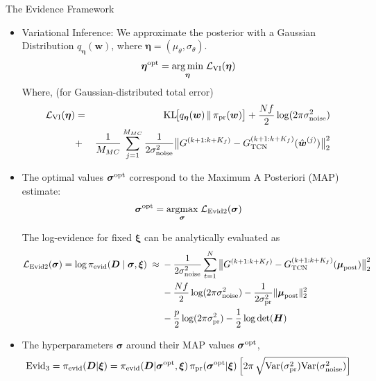 \documentclass[8pt,xcolor=dvipsnames,compress]{beamer}
\newcommand{\bs}{\boldsymbol}
\begin{document}
\begin{frame}{The Evidence Framework}
\begin{itemize}
\small
\item Variational Inference:
We approximate the posterior with a Gaussian Distribution
$q_{\bs\eta}(\bs w)$, where  $\bs\eta=(\mu_\theta,\sigma_\theta)$.
\[
\bs\eta^{\rm opt}
= \underset{\bs\eta}{\arg\min}\;
\mathcal{L}_{\rm VI}(\bs\eta)
\]
 Where, (for Gaussian-distributed total error)
    \begin{eqnarray}\label{eq:vi}
        \mathcal{L}_{\rm VI}(\bs \eta)
        & = & \mathrm{KL}\!\big[q_{\bs \eta}(\bs w) \,\|\, \pi_{\rm pr}(\bs w)\big]
        + \frac{Nf}{2} \log(2 \pi \sigma_{\rm noise}^2) \nonumber\\
        & + & \frac{1}{M_{MC}} \sum_{j=1}^{M_{MC}}
          \frac{1}{2\sigma_{\rm noise}^2}
          \big\| G^{(k+1:k+K_f)} - G^{(k+1:k+K_f)}_{\text{TCN}}(\hat{\bs w}^{(j)}) \big\|_2^2 
    \end{eqnarray}
\item The optimal values $\bs \sigma^{\rm opt}$ correspond to the Maximum A Posteriori (MAP) estimate:
\begin{equation}\label{eq:la_l2}
    \bs \sigma^{\rm opt} = \underset{\bs \sigma}{\rm argmax} \; 
    \mathcal{L}_{\rm Evid2}(\bs \sigma)
\end{equation}

The log-evidence for fixed $\bs \xi$ can be analytically evaluated as
\begin{equation}\label{eq:evid_l2}
\begin{aligned}
    \mathcal{L}_{\rm Evid2}(\bs \sigma) = \log \pi_{\rm evid}(\bs D \mid \bs \sigma, \bs \xi) 
    \;\approx\; 
    & -\frac{1}{2\sigma_{\rm noise}^2} 
      \sum_{t=1}^{N} 
      \big\| G^{(k+1:k+K_f)} - G^{(k+1:k+K_f)}_{\text{TCN}}(\bs \mu_{\rm post}) \big\|_2^2 \\
    & - \frac{Nf}{2}\log(2\pi \sigma_{\rm noise}^2) 
     - \frac{1}{2\sigma_{\rm pr}^2}\|\bs \mu_{\rm post}\|_2^2 \\
    & - \frac{p}{2} \log(2\pi \sigma_{\rm pr}^2) 
      - \frac{1}{2} \log \det (\bs H)
\end{aligned}
\end{equation}

\item The hyperparameters $\bs \sigma$ around their MAP values $\bs \sigma^{\rm opt}$,
    \begin{equation}\label{eq:evid_l3}
	\rm{Evid_3} =  \pi_{\rm evid} (\bs D| \bs \xi) = 
    \pi_{\rm evid} (\bs D| \bs \sigma^{\rm opt},  \bs \xi) \,
    \pi_{\rm pr} (\bs \sigma^{\rm opt} | \bs \xi)
    \left[ 
    2\pi \, \sqrt{Var(\sigma_{\rm pr}^2) Var(\sigma_{\rm noise}^2)}
    \right]
    \end{equation}
\end{itemize}
\end{frame}
\end{document}
